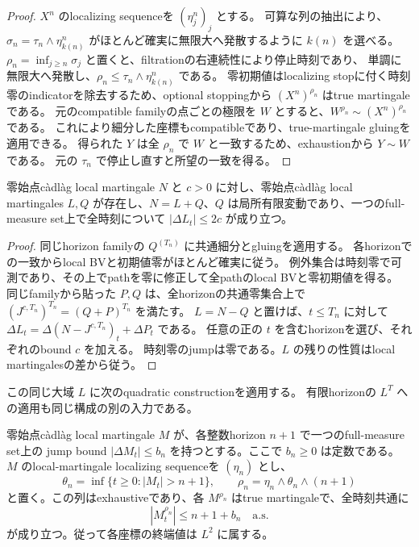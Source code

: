 \begin{proof}
$X^n$ のlocalizing sequenceを $(\eta^n_j)_j$ とする。
可算な列の抽出により、$\sigma_n=\tau_n\wedge\eta^n_{k(n)}$ がほとんど確実に無限大へ発散するように
$k(n)$ を選べる。$\rho_n=\inf_{j\geq n}\sigma_j$ と置くと、filtrationの右連続性により停止時刻であり、
単調に無限大へ発散し、$\rho_n\leq\tau_n\wedge\eta^n_{k(n)}$ である。
零初期値はlocalizing stopに付く時刻零のindicatorを除去するため、optional stoppingから
$(X^n)^{\rho_n}$ はtrue martingaleである。
元のcompatible familyの点ごとの極限を $W$ とすると、$W^{\rho_n}\sim(X^n)^{\rho_n}$ である。
これにより細分した座標もcompatibleであり、true-martingale gluingを適用できる。
得られた $Y$ は全 $\rho_n$ で $W$ と一致するため、exhaustionから $Y\sim W$ である。
元の $\tau_n$ で停止し直すと所望の一致を得る。
\end{proof}

\begin{proposition}
零始点c\`adl\`ag local martingale $N$ と $c>0$ に対し、零始点c\`adl\`ag local martingales
$L,Q$ が存在し、$N=L+Q$、$Q$ は局所有限変動であり、一つのfull-measure set上で全時刻について
$|\Delta L_t|\leq2c$ が成り立つ。
\end{proposition}

\begin{proof}
同じhorizon familyの $Q^{(T_n)}$ に共通細分とgluingを適用する。
各horizonでの一致からlocal BVと初期値零がほとんど確実に従う。
例外集合は時刻零で可測であり、その上でpathを零に修正して全pathのlocal BVと零初期値を得る。
同じfamilyから貼った $P,Q$ は、全horizonの共通零集合上で
$(J^{c,T_n})^{T_n}=(Q+P)^{T_n}$ を満たす。
$L=N-Q$ と置けば、$t\leq T_n$ に対して
$\Delta L_t=\Delta(N-J^{c,T_n})_t+\Delta P_t$ である。
任意の正の $t$ を含むhorizonを選び、それぞれのbound $c$ を加える。
時刻零のjumpは零である。$L$ の残りの性質はlocal martingalesの差から従う。
\end{proof}

この同じ大域 $L$ に次のquadratic constructionを適用する。
有限horizonの $L^T$ への適用も同じ構成の別の入力である。

\begin{lemma}
零始点c\`adl\`ag local martingale $M$ が、各整数horizon $n+1$ で一つのfull-measure set上の
jump bound $|\Delta M_t|\leq b_n$ を持つとする。ここで $b_n\geq0$ は定数である。
$M$ のlocal-martingale localizing sequenceを $(\eta_n)$ とし、
\[
 \theta_n=\inf\{t\geq0:|M_t|>n+1\},\qquad
 \rho_n=\eta_n\wedge\theta_n\wedge(n+1)
\]
と置く。この列はexhaustiveであり、各 $M^{\rho_n}$ はtrue martingaleで、全時刻共通に
\[
 |M^{\rho_n}_t|\leq n+1+b_n\quad\text{a.s.}
\]
が成り立つ。従って各座標の終端値は $L^2$ に属する。
\end{lemma}

